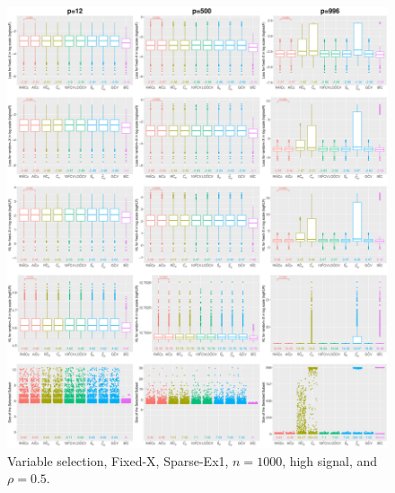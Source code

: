\begin{figure}[!ht]
\centering
\includegraphics[width=\textwidth]{figures/supplement/fixedx/subset_selection/Sparse-Ex1_n1000_hsnr_rho05.eps}
\caption{Variable selection, Fixed-X, Sparse-Ex1, $n=1000$, high signal, and $\rho=0.5$.}
\end{figure}
\clearpage
